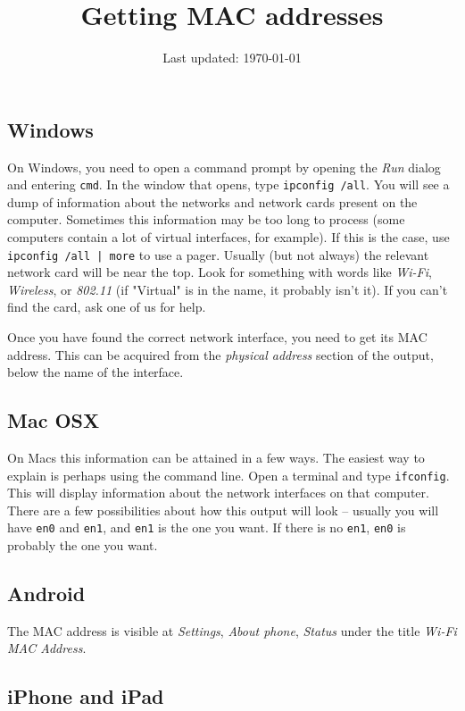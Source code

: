\documentclass[12pt]{article}
\title{Getting MAC addresses}
\author{}
\date{Last updated: \today}
\begin{document}
\maketitle

\subsection{Windows}

On Windows, you need to open a command prompt by opening the \emph{Run} dialog
and entering \texttt{cmd}. In the window that opens, type \texttt{ipconfig
/all}. You will see a dump of information about the networks and network cards
present on the computer. Sometimes this information may be too long to process
(some computers contain a lot of virtual interfaces, for example). If this is
the case, use \texttt{ipconfig /all | more} to use a pager.  Usually (but not
always) the relevant network card will be near the top. Look for something with
words like \emph{Wi-Fi}, \emph{Wireless}, or \emph{802.11} (if "Virtual" is in
the name, it probably isn't it).  If you can't find the card, ask one of us for
help.

Once you have found the correct network interface, you need to get its MAC
address. This can be acquired from the \emph{physical address} section of the
output, below the name of the interface.

\subsection{Mac OSX}

On Macs this information can be attained in a few ways. The easiest way to
explain is perhaps using the command line. Open a terminal and type
\texttt{ifconfig}. This will display information about the network interfaces
on that computer. There are a few possibilities about how this output will look
-- usually you will have \texttt{en0} and \texttt{en1}, and \texttt{en1} is the
one you want. If there is no \texttt{en1}, \texttt{en0} is probably the one you
want.

\subsection{Android}

The MAC address is visible at \emph{Settings}, \emph{About phone}, \emph{Status}
under the title \emph{Wi-Fi MAC Address}.

\subsection{iPhone and iPad}
\end{document}
